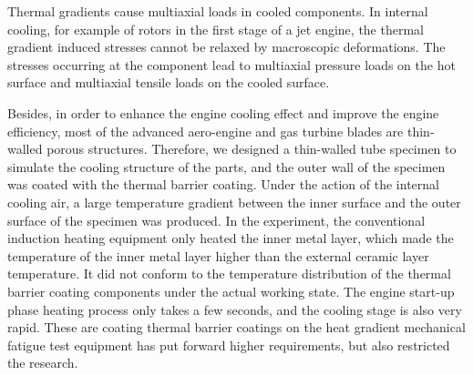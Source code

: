 \documentclass[preprint,5p,twocolumn,11pt,sort&compress]{elsarticle}
\begin{document}
Thermal gradients cause multiaxial loads in cooled components.
In internal cooling, for example of rotors in the first stage of a jet engine, the thermal gradient induced stresses cannot be relaxed by macroscopic deformations.
The stresses occurring at the component lead to multiaxial pressure loads on the hot surface and multiaxial tensile loads on the cooled surface.

Besides, in order to enhance the engine cooling effect and improve the engine efficiency, most of the advanced aero-engine and gas turbine blades are thin-walled porous structures.
Therefore, we designed a thin-walled tube specimen to simulate the cooling structure of the parts, and the outer wall of the specimen was coated with the thermal barrier coating.
Under the action of the internal cooling air, a large temperature gradient between the inner surface and the outer surface of the specimen was produced.
In the experiment, the conventional induction heating equipment only heated the inner metal layer, which made the temperature of the inner metal layer higher than the external ceramic layer temperature. It did not conform to the temperature distribution of the thermal barrier coating components under the actual working state.
The engine start-up phase heating process only takes a few seconds, and the cooling stage is also very rapid. These are coating thermal barrier coatings on the heat gradient mechanical fatigue test equipment has put forward higher requirements, but also restricted the research.
\end{document}
